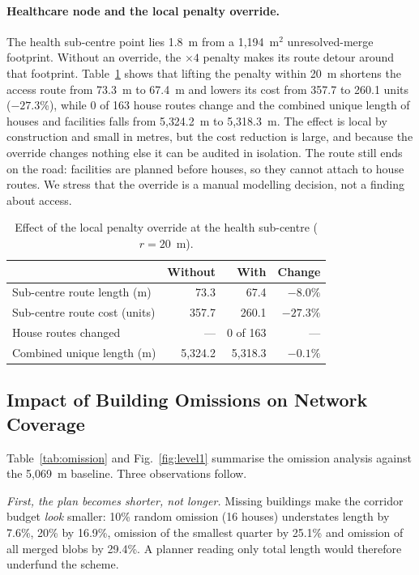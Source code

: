 \documentclass[journal]{IEEEtran}
\begin{document}
\paragraph{Healthcare node and the local penalty override.}
The health sub-centre point lies 1.8~m from a 1{,}194~m$^2$ unresolved-merge footprint. Without an override, the $\times4$ penalty makes its route detour around that footprint. Table~\ref{tab:override} shows that lifting the penalty within 20~m shortens the access route from 73.3~m to 67.4~m and lowers its cost from 357.7 to 260.1 units ($-27.3$\%), while 0 of 163 house routes change and the combined unique length of houses and facilities falls from 5{,}324.2~m to 5{,}318.3~m. The effect is local by construction and small in metres, but the cost reduction is large, and because the override changes nothing else it can be audited in isolation. The route still ends on the road: facilities are planned before houses, so they cannot attach to house routes. We stress that the override is a manual modelling decision, not a finding about access.

\begin{table}[t]
\centering
\caption{Effect of the local penalty override at the health sub-centre ($r=20$~m).}
\label{tab:override}
\small
\begin{tabular}{@{}lrrr@{}}
\toprule
 & Without & With & Change\\
\midrule
Sub-centre route length (m) & 73.3 & 67.4 & $-8.0\%$\\
Sub-centre route cost (units) & 357.7 & 260.1 & $-27.3\%$\\
House routes changed & --- & 0 of 163 & ---\\
Combined unique length (m) & 5{,}324.2 & 5{,}318.3 & $-0.1\%$\\
\bottomrule
\end{tabular}
\end{table}

\subsection{Impact of Building Omissions on Network Coverage}
Table~\ref{tab:omission} and Fig.~\ref{fig:level1} summarise the omission analysis against the 5{,}069~m baseline. Three observations follow.

\emph{First, the plan becomes shorter, not longer.} Missing buildings make the corridor budget \emph{look} smaller: 10\% random omission (16 houses) understates length by 7.6\%, 20\% by 16.9\%, omission of the smallest quarter by 25.1\% and omission of all merged blobs by 29.4\%. A planner reading only total length would therefore underfund the scheme.
\end{document}
